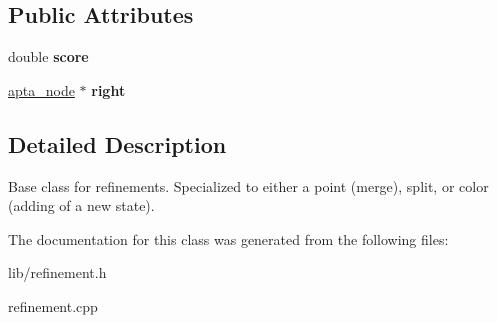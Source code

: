 \subsection*{Public Attributes}
\begin{DoxyCompactItemize}
\item 
double {\bfseries score}\hypertarget{classrefinement_a024cfbac56c02c168736c38f17f0a197}{}\label{classrefinement_a024cfbac56c02c168736c38f17f0a197}

\item 
\hyperlink{classapta__node}{apta\+\_\+node} $\ast$ {\bfseries right}\hypertarget{classrefinement_a60169bd9df35b3a61404395da1e09b05}{}\label{classrefinement_a60169bd9df35b3a61404395da1e09b05}

\end{DoxyCompactItemize}


\subsection{Detailed Description}
Base class for refinements. Specialized to either a point (merge), split, or color (adding of a new state). 

The documentation for this class was generated from the following files\+:\begin{DoxyCompactItemize}
\item 
lib/refinement.\+h\item 
refinement.\+cpp\end{DoxyCompactItemize}
